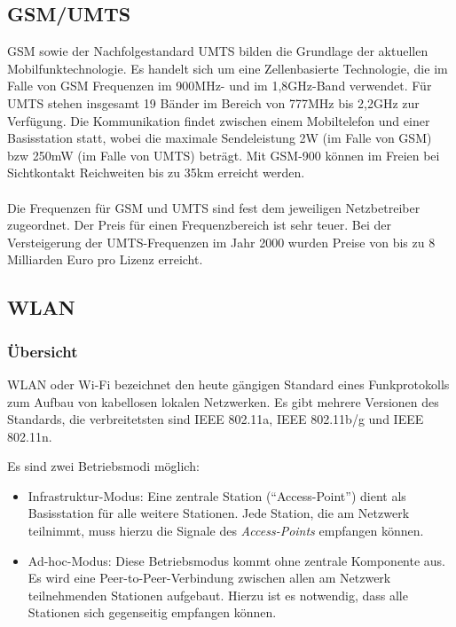     \subsection{GSM/UMTS}
        GSM sowie der Nachfolgestandard UMTS bilden die Grundlage der aktuellen Mobilfunktechnologie.
        Es handelt sich um eine Zellenbasierte Technologie, die im Falle von GSM Frequenzen im
        900MHz- und im 1,8GHz-Band verwendet. Für UMTS stehen insgesamt 19 Bänder im Bereich von 777MHz 
        bis 2,2GHz zur Verfügung. Die Kommunikation findet zwischen einem Mobiltelefon und einer
        Basisstation statt, wobei die maximale Sendeleistung 2W (im Falle von GSM) bzw 250mW (im Falle
        von UMTS) beträgt. Mit GSM-900 können im Freien bei Sichtkontakt Reichweiten bis zu 35km erreicht
        werden.\\
        \\
        Die Frequenzen für GSM und UMTS sind fest dem jeweiligen Netzbetreiber zugeordnet. Der Preis
        für einen Frequenzbereich ist sehr teuer. Bei der Versteigerung der UMTS-Frequenzen im 
        Jahr 2000 wurden Preise von bis zu 8 Milliarden Euro pro Lizenz erreicht. 
    \subsection{WLAN}\label{wlan}
        \subsubsection{Übersicht}
            WLAN oder Wi-Fi bezeichnet den heute gängigen Standard eines Funkprotokolls zum Aufbau
            von kabellosen lokalen Netzwerken. Es gibt mehrere Versionen des Standards, die verbreitetsten
            sind IEEE 802.11a, IEEE 802.11b/g und IEEE 802.11n. 

            Es sind zwei Betriebsmodi möglich:

            \begin{itemize}
                \item{Infrastruktur-Modus:} Eine zentrale Station ("`Access-Point"') dient als Basisstation
                                            für alle weitere Stationen. Jede Station, die am Netzwerk
                                            teilnimmt, muss hierzu die Signale des \textsl{Access-Points} 
                                            empfangen können.
                \item{Ad-hoc-Modus:} Diese Betriebsmodus kommt ohne zentrale Komponente aus. Es wird eine
                                     Peer-to-Peer-Verbindung zwischen allen am Netzwerk teilnehmenden 
                                     Stationen aufgebaut. Hierzu ist es notwendig, dass alle Stationen
                                     sich gegenseitig empfangen können.
            \end{itemize}

